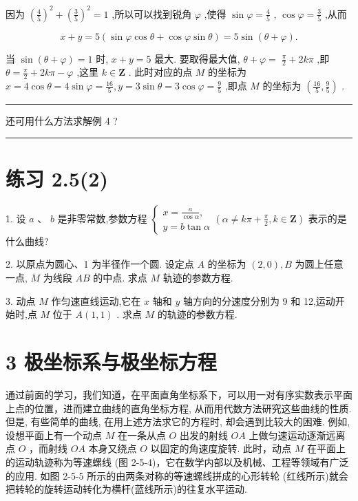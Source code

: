 \documentclass[10pt]{article}
\newcommand{\HRule}{\begin{center}\rule{0.9\linewidth}{0.2mm}\end{center}}
\begin{document}
因为 \({\left( \frac{4}{5}\right) }^{2} + {\left( \frac{3}{5}\right) }^{2} = 1\) ,所以可以找到锐角 \(\varphi\) ,使得 \(\sin \varphi  = \frac{4}{5}\) , \(\cos \varphi  = \frac{3}{5}\) ,从而

\[
x + y = 5\left( {\sin \varphi \cos \theta  + \cos \varphi \sin \theta }\right)  = 5\sin \left( {\theta  + \varphi }\right) .
\]

当 \(\sin \left( {\theta  + \varphi }\right)  = 1\) 时, \(x + y = 5\) 最大. 要取得最大值, \(\theta  + \varphi  = \; \frac{\pi }{2} + {2k\pi }\) ,即 \(\theta  = \frac{\pi }{2} + {2k\pi } - \varphi\) ,这里 \(k \in  \mathbf{Z}\) . 此时对应的点 \(M\) 的坐标为 \(x = 4\cos \theta  = 4\sin \varphi  = \frac{16}{5},y = 3\sin \theta  = 3\cos \varphi  = \frac{9}{5}\) ,即点 \(M\) 的坐标为 \(\left( {\frac{16}{5},\frac{9}{5}}\right)\) .

\HRule

还可用什么方法求解例 4 ?

\HRule

\section*{练习 2.5(2)}

1. 设 \(a\text{ 、 }b\) 是非零常数,参数方程 \(\left\{  {\begin{array}{l} x = \frac{a}{\cos \alpha }, \\  y = b\tan \alpha  \end{array}\left( {\alpha  \neq  {k\pi } + \frac{\pi }{2},k \in  \mathbf{Z}}\right) }\right.\) 表示的是什么曲线?

2. 以原点为圆心、1 为半径作一个圆. 设定点 \(A\) 的坐标为 \(\left( {2,0}\right) ,B\) 为圆上任意一点, \(M\) 为线段 \({AB}\) 的中点. 求点 \(M\) 轨迹的参数方程.

3. 动点 \(M\) 作匀速直线运动,它在 \(x\) 轴和 \(y\) 轴方向的分速度分别为 9 和 12,运动开始时,点 \(M\) 位于 \(A\left( {1,1}\right)\) . 求点 \(M\) 的轨迹的参数方程.

\section*{3 极坐标系与极坐标方程}

通过前面的学习，我们知道，在平面直角坐标系下，可以用一对有序实数表示平面上点的位置，进而建立曲线的直角坐标方程, 从而用代数方法研究这些曲线的性质. 但是, 有些简单的曲线, 在用上述方法求它的方程时, 却会遇到比较大的困难. 例如,设想平面上有一个动点 \(M\) 在一条从点 \(O\) 出发的射线 \({OA}\) 上做匀速运动逐渐远离点 \(O\) ，而射线 \({OA}\) 本身又绕点 \(O\) 以固定的角速度旋转. 此时，动点 \(M\) 在平面上的运动轨迹称为等速螺线 (图 2-5-4)，它在数学内部以及机械、工程等领域有广泛的应用. 如图 2-5-5 所示的由两条对称的等速螺线拼成的心形转轮 (红线所示)就会把转轮的旋转运动转化为横杆(蓝线所示)的往复水平运动.
\end{document}
